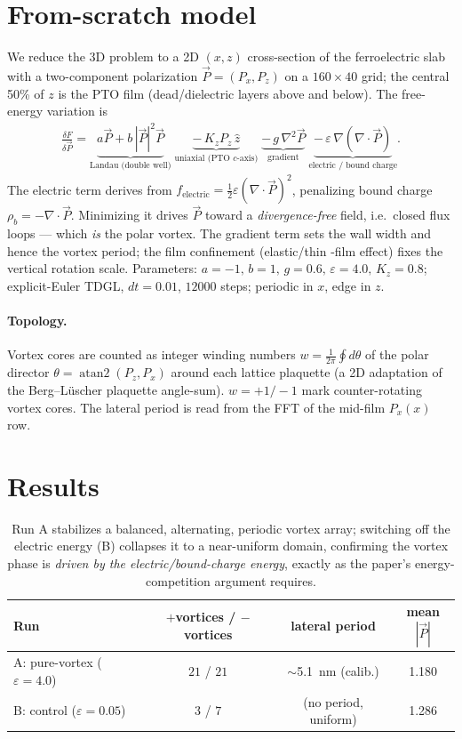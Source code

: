 \documentclass[11pt]{article}
\begin{document}
\section{From-scratch model}
We reduce the 3D problem to a 2D $(x,z)$ cross-section of the ferroelectric
slab with a two-component polarization $\vec P=(P_x,P_z)$ on a
$160\times40$ grid; the central 50\% of $z$ is the PTO film (dead/dielectric
layers above and below). The free-energy variation is
\begin{align}
\frac{\delta F}{\delta \vec P} =
\underbrace{a\vec P + b\,|\vec P|^2\vec P}_{\text{Landau (double well)}}
\;\underbrace{-\,K_z P_z\,\hat z}_{\text{uniaxial (PTO $c$-axis)}}
\;\underbrace{-\,g\,\nabla^2\vec P}_{\text{gradient}}
\;\underbrace{-\,\varepsilon\,\nabla(\nabla\!\cdot\!\vec P)}_{\text{electric / bound charge}} .
\end{align}
The electric term derives from $f_{\text{electric}}=\tfrac12\varepsilon
(\nabla\!\cdot\!\vec P)^2$, penalizing bound charge $\rho_b=-\nabla\!\cdot\!\vec P$.
Minimizing it drives $\vec P$ toward a \emph{divergence-free} field, i.e.\
closed flux loops --- which \emph{is} the polar vortex. The gradient term sets
the wall width and hence the vortex period; the film confinement (elastic/thin
-film effect) fixes the vertical rotation scale. Parameters:
$a=-1,\,b=1,\,g=0.6,\,\varepsilon=4.0,\,K_z=0.8$; explicit-Euler TDGL,
$dt=0.01$, $12000$ steps; periodic in $x$, edge in $z$.

\paragraph{Topology.} Vortex cores are counted as integer winding numbers
$w=\frac{1}{2\pi}\oint d\theta$ of the polar director
$\theta=\operatorname{atan2}(P_z,P_x)$ around each lattice plaquette
(a 2D adaptation of the Berg--L\"uscher plaquette angle-sum). $w=+1/-1$
mark counter-rotating vortex cores. The lateral period is read from the FFT
of the mid-film $P_x(x)$ row.

\section{Results}
\begin{table}[h]\centering
\begin{tabular}{lccc}
\toprule
Run & $+$vortices / $-$vortices & lateral period & mean $|\vec P|$ \\
\midrule
A: pure-vortex ($\varepsilon=4.0$) & $21$ / $21$ & $\sim$5.1~nm (calib.) & 1.180 \\
B: control ($\varepsilon=0.05$)   & $3$ / $7$   & (no period, uniform) & 1.286 \\
\bottomrule
\end{tabular}
\caption{Run A stabilizes a balanced, alternating, periodic vortex array;
switching off the electric energy (B) collapses it to a near-uniform domain,
confirming the vortex phase is \emph{driven by the electric/bound-charge
energy}, exactly as the paper's energy-competition argument requires.}
\end{table}
\end{document}
